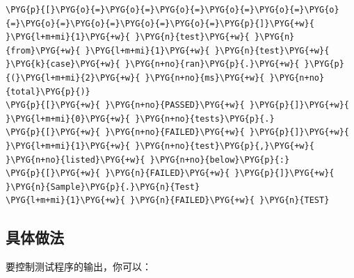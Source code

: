 \begin{codeblockbg}
\begin{Verbatim}[commandchars=\\\{\},breaklines=true,breakanywhere=true,fontsize=\codefont,xleftmargin=17bp]
\PYG{p}{[}\PYG{o}{=}\PYG{o}{=}\PYG{o}{=}\PYG{o}{=}\PYG{o}{=}\PYG{o}{=}\PYG{o}{=}\PYG{o}{=}\PYG{o}{=}\PYG{o}{=}\PYG{p}{]}\PYG{+w}{ }\PYG{l+m+mi}{1}\PYG{+w}{ }\PYG{n}{test}\PYG{+w}{ }\PYG{n}{from}\PYG{+w}{ }\PYG{l+m+mi}{1}\PYG{+w}{ }\PYG{n}{test}\PYG{+w}{ }\PYG{k}{case}\PYG{+w}{ }\PYG{n+no}{ran}\PYG{p}{.}\PYG{+w}{ }\PYG{p}{(}\PYG{l+m+mi}{2}\PYG{+w}{ }\PYG{n+no}{ms}\PYG{+w}{ }\PYG{n+no}{total}\PYG{p}{)}
\PYG{p}{[}\PYG{+w}{ }\PYG{n+no}{PASSED}\PYG{+w}{ }\PYG{p}{]}\PYG{+w}{ }\PYG{l+m+mi}{0}\PYG{+w}{ }\PYG{n+no}{tests}\PYG{p}{.}
\PYG{p}{[}\PYG{+w}{ }\PYG{n+no}{FAILED}\PYG{+w}{ }\PYG{p}{]}\PYG{+w}{ }\PYG{l+m+mi}{1}\PYG{+w}{ }\PYG{n+no}{test}\PYG{p}{,}\PYG{+w}{ }\PYG{n+no}{listed}\PYG{+w}{ }\PYG{n+no}{below}\PYG{p}{:}
\PYG{p}{[}\PYG{+w}{ }\PYG{n}{FAILED}\PYG{+w}{ }\PYG{p}{]}\PYG{+w}{ }\PYG{n}{Sample}\PYG{p}{.}\PYG{n}{Test}
\PYG{l+m+mi}{1}\PYG{+w}{ }\PYG{n}{FAILED}\PYG{+w}{ }\PYG{n}{TEST}
\end{Verbatim}
\end{codeblockbg}



\subsection{具体做法}



要控制测试程序的输出，你可以：



